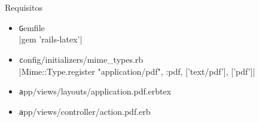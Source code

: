 \documentclass{beamer}
\begin{document}
  \begin{frame}{Requisitos}
    \begin{center}
      \begin{itemize}
        \item {\texttt Gemfile}\\|gem 'rails-latex'|
        \item {\texttt config/initializers/mime\_types.rb}\\{\scriptsize {}|Mime::Type.register "application/pdf", :pdf, ['text/pdf'], ['pdf']|}
        \item {\texttt app/views/layouts/application.pdf.erbtex}
        \item {\texttt app/views/controller/action.pdf.erb}
      \end{itemize}
    \end{center}
  \end{frame}
  \begin{frame}[plain]
    \titlepage
  \end{frame}
\end{document}
